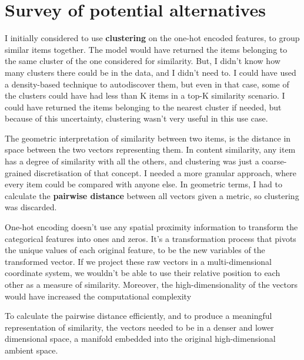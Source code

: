 
\section{Survey of potential alternatives}

I initially considered to use \textbf{clustering} on the one-hot encoded features, to group similar items together.
The model would have returned the items belonging to the same cluster of the one considered for similarity.
But, I didn't know how many clusters there could be in the data, and I didn't need to.
I could have used a density-based technique to autodiscover them,
but even in that case, some of the clusters could have had less than K items in a top-K similarity scenario.
I could have returned the items belonging to the nearest cluster if needed, but because of this uncertainty,
clustering wasn't very useful in this use case.

The geometric interpretation of similarity between two items, is the distance in space between the two vectors representing them.
In content similarity, any item has a degree of similarity with all the others, and clustering was just a coarse-grained discretisation of that concept.
I needed a more granular approach, where every item could be compared with anyone else.
In geometric terms, I had to calculate the \textbf{pairwise distance} between all vectors given a metric, so clustering was discarded.

One-hot encoding doesn't use any spatial proximity information to transform the categorical features into ones and zeros.
It's a transformation process that pivots the unique values of each original feature, to be the new variables of the transformed vector.
If we project these raw vectors in a multi-dimensional coordinate system, we wouldn't be able to use their
relative position to each other as a measure of similarity. Moreover, the high-dimensionality of the vectors would have increased
the computational complexity

To calculate the pairwise distance efficiently, and to produce a meaningful representation of similarity, the vectors
needed to be in a denser and lower dimensional space, a manifold embedded into the original
high-dimensional ambient space.


